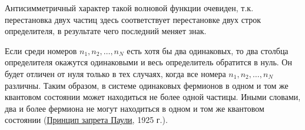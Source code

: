 Антисимметричный характер такой волновой функции очевиден, т.к. перестановка двух частиц здесь соответствует перестановке двух строк определителя, в результате чего последний меняет знак.

Если среди номеров $n_1, n_2, \dots, n_N$ есть хотя бы два одинаковых, то два столбца определителя окажутся одинаковыми и весь определитель обратится в нуль. Он будет отличен от нуля только в тех случаях, когда все номера $n_1, n_2, \dots, n_N$ различны. Таким образом, в системе одинаковых фермионов в одном и том же квантовом состоянии может находиться не более одной частицы. Иными словами, два и более фермиона не могут находиться в одном и том же квантовом состоянии (\underline{Принцип запрета Паули}, 1925 г.).